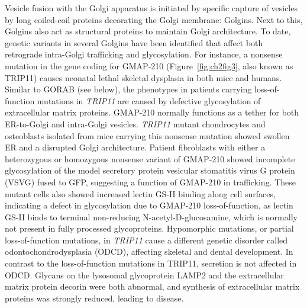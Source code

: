 Vesicle fusion with the Golgi apparatus is initiated by specific capture of vesicles by long coiled-coil proteins decorating the Golgi membrane: Golgins\cite{muschalik_golgins_2018,wong_membrane_2014,wong_golgin_2017,witkos_golgin_2016}. Next to this, Golgins also act as structural proteins to maintain Golgi architecture\cite{barr_grasp65_1997}. To date, genetic variants in several Golgins have been identified that affect both retrograde intra-Golgi trafficking and glycosylation. For instance, a nonsense mutation in the gene coding for GMAP-210 (Figure~\ref{fig:ch2fig3}, also known as TRIP11) causes neonatal lethal skeletal dysplasia in both mice and humans\cite{smits_lethal_2010}. Similar to GORAB (see below), the phenotypes in patients carrying loss-of-function mutations in \emph{TRIP11} are caused by defective glycosylation of extracellular matrix proteins. GMAP-210 normally functions as a tether for both ER-to-Golgi and intra-Golgi vesicles\cite{roboti_golgin_2015,sato_coupling_2014}. \emph{TRIP11} mutant chondrocytes and osteoblasts isolated from mice carrying this nonsense mutation showed swollen ER and a disrupted Golgi architecture. Patient fibroblasts with either a heterozygous or homozygous nonsense variant of GMAP-210 showed incomplete glycosylation of the model secretory protein vesicular stomatitis virus G protein (VSVG) fused to GFP, suggesting a function of GMAP-210 in trafficking. These mutant cells also showed increased lectin GS-II binding along cell surfaces, indicating a defect in glycosylation due to GMAP-210 loss-of-function, as lectin GS-II binds to terminal non-reducing N-acetyl-D-glucosamine, which is normally not present in fully processed glycoproteins\cite{smits_lethal_2010}. Hypomorphic mutations, or partial loss-of-function mutations, in \emph{TRIP11} cause a different genetic disorder called odontochondrodysplasia (ODCD)\cite{wehrle_hypomorphic_2019}, affecting skeletal and dental development. In contrast to the loss-of-function mutations in TRIP11, secretion is not affected in ODCD. Glycans on the lysosomal glycoprotein LAMP2 and the extracellular matrix protein decorin were both abnormal, and synthesis of extracellular matrix proteins was strongly reduced, leading to disease\cite{wehrle_hypomorphic_2019}.

